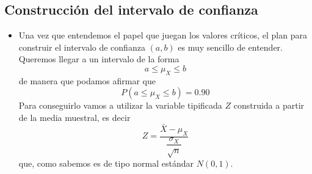        \subsection*{Construcción del intervalo de confianza}

       \begin{itemize}

       \item Una vez que entendemos el papel que juegan los valores críticos, el plan para construir el         intervalo de confianza $(a,b)$ es muy sencillo de entender. Queremos llegar a un intervalo de la forma
       \[a\leq \mu_X\leq b\]
       de manera que podamos afirmar que
       \[P(a\leq \mu_{X}\leq b)=0.90\]
       Para conseguirlo vamos a utilizar la variable tipificada $Z$ construida a partir de la media muestral, es decir
       \[Z=\dfrac{\bar X-\mu_X}{\dfrac{\sigma_X}{\sqrt{n}}}\]
       que, como sabemos es de tipo normal estándar $N(0,1)$.


\end{itemize}
